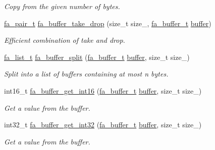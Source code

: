 \begin{DoxyCompactItemize}
\begin{DoxyCompactList}\small\item\em Copy from the given number of bytes. \end{DoxyCompactList}\item 
\hyperlink{group___fa_pair_gac2b2e58c230bac4f8a63ef6c05072680}{fa\-\_\-pair\-\_\-t} \hyperlink{group___fa_buffer_gac7d4196d3cdf0c3221d27f8c982e00f2}{fa\-\_\-buffer\-\_\-take\-\_\-drop} (size\-\_\-t size\-\_\-, \hyperlink{group___fa_buffer_ga0ed7a1d783ab322e2e8be02432d0839e}{fa\-\_\-buffer\-\_\-t} \hyperlink{util_8h_ad0c623e8b04565926f5b48888327724a}{buffer})
\begin{DoxyCompactList}\small\item\em Efficient combination of take and drop. \end{DoxyCompactList}\item 
\hyperlink{group___fa_list_ga35ecb12ab934ded0cce0bcf28e3bc5d2}{fa\-\_\-list\-\_\-t} \hyperlink{group___fa_buffer_ga270797e37d8d7b94321ee7636407a5d3}{fa\-\_\-buffer\-\_\-split} (\hyperlink{group___fa_buffer_ga0ed7a1d783ab322e2e8be02432d0839e}{fa\-\_\-buffer\-\_\-t} \hyperlink{util_8h_ad0c623e8b04565926f5b48888327724a}{buffer}, size\-\_\-t size\-\_\-)
\begin{DoxyCompactList}\small\item\em Split into a list of buffers containing at most n bytes. \end{DoxyCompactList}\item 
int16\-\_\-t \hyperlink{group___fa_buffer_ga8179fe2b2edda4927721fd5a45d2e18c}{fa\-\_\-buffer\-\_\-get\-\_\-int16} (\hyperlink{group___fa_buffer_ga0ed7a1d783ab322e2e8be02432d0839e}{fa\-\_\-buffer\-\_\-t} \hyperlink{util_8h_ad0c623e8b04565926f5b48888327724a}{buffer}, size\-\_\-t size\-\_\-)
\begin{DoxyCompactList}\small\item\em Get a value from the buffer. \end{DoxyCompactList}\item 
int32\-\_\-t \hyperlink{group___fa_buffer_ga51609720018ae6391083205b260db9a7}{fa\-\_\-buffer\-\_\-get\-\_\-int32} (\hyperlink{group___fa_buffer_ga0ed7a1d783ab322e2e8be02432d0839e}{fa\-\_\-buffer\-\_\-t} \hyperlink{util_8h_ad0c623e8b04565926f5b48888327724a}{buffer}, size\-\_\-t size\-\_\-)
\begin{DoxyCompactList}\small\item\em Get a value from the buffer. \end{DoxyCompactList}\item 

\end{DoxyCompactItemize}

